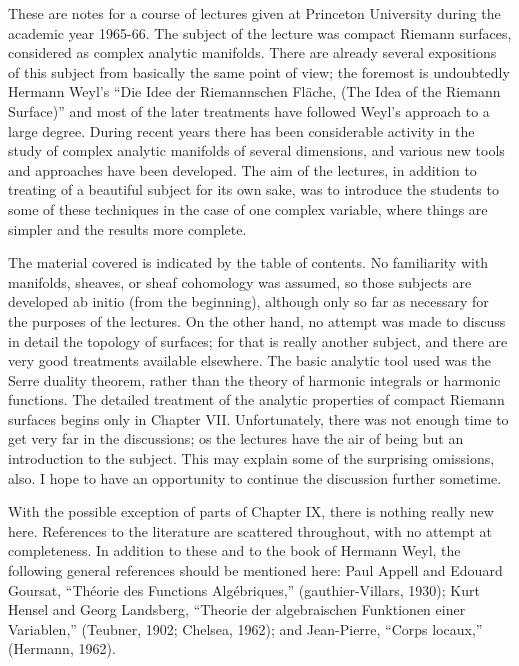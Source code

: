 %
%

\preface

These are notes for a course of lectures given at Princeton University during the academic year 1965-66. The subject of the lecture was compact Riemann surfaces, considered as complex analytic manifolds. There are already several expositions of this subject from basically the same point of view; the foremost is undoubtedly Hermann Weyl's ``Die Idee der Riemannschen Fl\"ache, (The Idea of the Riemann Surface)'' and most of the later treatments have followed Weyl's approach to a large degree. During recent years there has been considerable activity in the study of complex analytic manifolds of several dimensions, and various new tools and approaches have been developed. The aim of the lectures, in addition to treating of a beautiful subject for its own sake, was to introduce the students to some of these techniques in the case of one complex variable, where things are simpler and the results more complete.\par

The material covered is indicated by the table of contents. No familiarity with manifolds, sheaves, or sheaf cohomology was assumed, so those subjects are developed ab initio (from the beginning), although only so far as necessary for the purposes of the lectures. On the other hand, no attempt was made to discuss in detail the topology of surfaces; for that is really another subject, and there are very good treatments available elsewhere. The basic analytic tool used was the Serre duality theorem, rather than the theory of harmonic integrals or harmonic functions. The detailed treatment of the analytic properties of compact Riemann surfaces begins only in Chapter VII. Unfortunately, there was not enough time to get very far in the discussions; os the lectures have the air of being but an introduction to the subject. This may explain some of the surprising omissions, also. I hope to have an opportunity to continue the discussion further sometime.\par

With the possible exception of parts of Chapter IX, there is nothing really new here. References to the literature are scattered throughout, with no attempt at completeness. In addition to these and to the book of Hermann Weyl, the following general references should be mentioned here: Paul Appell and Edouard Goursat, ``Th\'eorie des Functions Alg\'ebriques,'' (gauthier-Villars, 1930); Kurt Hensel and Georg Landsberg, ``Theorie der algebraischen Funktionen einer Variablen,'' (Teubner, 1902; Chelsea, 1962); and Jean-Pierre, ``Corps locaux,'' (Hermann, 1962).\par

